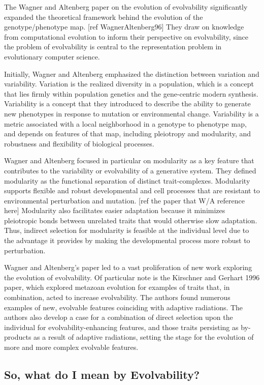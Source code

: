 The Wagner and Altenberg paper on the evolution of evolvability significantly expanded the theoretical framework behind the evolution of the genotype/phenotype map. [ref WagnerAltenberg96] They draw on knowledge from computational evolution to inform their perspective on evolvability, since the problem of evolvability is central to the representation problem in evolutionary computer science. 

Initially, Wagner and Altenberg emphasized the distinction between variation and variability. Variation is the realized diversity in a population, which is a concept that lies firmly within population genetics and the gene-centric modern synthesis.  Variability is a concept that they introduced to describe the ability to generate new phenotypes in response to mutation or environmental change. Variability is a metric associated with a local neighborhood in a genotype to phenotype map, and depends on features of that map, including pleiotropy and modularity, and robustness and flexibility of biological processes.

Wagner and Altenberg focused in particular on modularity as a key feature that contributes to the variability or evolvability of a generative system. They defined modularity as the functional separation of distinct trait-complexes. Modularity supports flexible and robust developmental and cell processes that are resistant to environmental perturbation and mutation. [ref the paper that W/A reference here] Modularity also facilitates easier adaptation because it minimizes pleiotropic bonds between unrelated traits that would otherwise slow adaptation. Thus, indirect selection for modularity is feasible at the individual level due to the advantage it provides by making the developmental process more robust to perturbation.

Wagner and Altenberg’s paper led to a vast proliferation of new work exploring the evolution of evolvability. Of particular note is the Kirschner and Gerhart 1996 paper, which explored metazoan evolution for examples of traits that, in combination, acted to increase evolvability. The authors found numerous examples of new, evolvable features coinciding with adaptive radiations. The authors also develop a case for a combination of direct selection upon the individual for evolvability-enhancing features, and those traits persisting as by-products as a result of adaptive radiations, setting the stage for the evolution of more and more complex evolvable features.

\subsection{So, what do I mean by Evolvability?}

